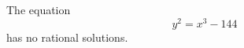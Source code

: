 \begin{proposition}
    The equation
\[
    y^2=x^3-144
\]
    has no rational solutions.
\end{proposition}
